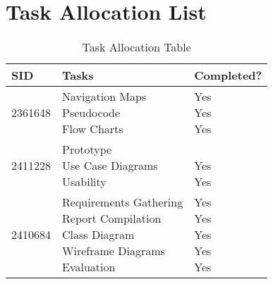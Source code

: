\chapter{Task Allocation List}
\vspace{100pt}
\begin{table}[ht]
    \centering
    \renewcommand{\arraystretch}{1.8}
    \setlength{\tabcolsep}{12pt}
    \setlength{\arrayrulewidth}{0.7mm}
    {\Large
        \begin{tabular}{|l|l|l|}
            \hline
            \textbf{SID} & \textbf{Tasks} & \textbf{Completed?} \\
            \hline
            2361648 & \makecell{Navigation Maps \\ Pseudocode \\ Flow Charts} & \makecell{Yes \\ Yes \\ Yes} \\
            \hline
            2411228 & \makecell{Prototype \\ Use Case Diagrams \\ Usability} & \makecell{\\ Yes \\ Yes} \\
            \hline
            2410684 & \makecell{Requirements Gathering \\ Report Compilation \\ Class Diagram \\ Wireframe Diagrams \\ Evaluation} & \makecell{Yes \\ Yes \\ Yes \\ Yes \\ Yes} \\
            \hline
        \end{tabular}
    }
    \caption{Task Allocation Table}
    \label{tab:taskallocation}
\end{table}
